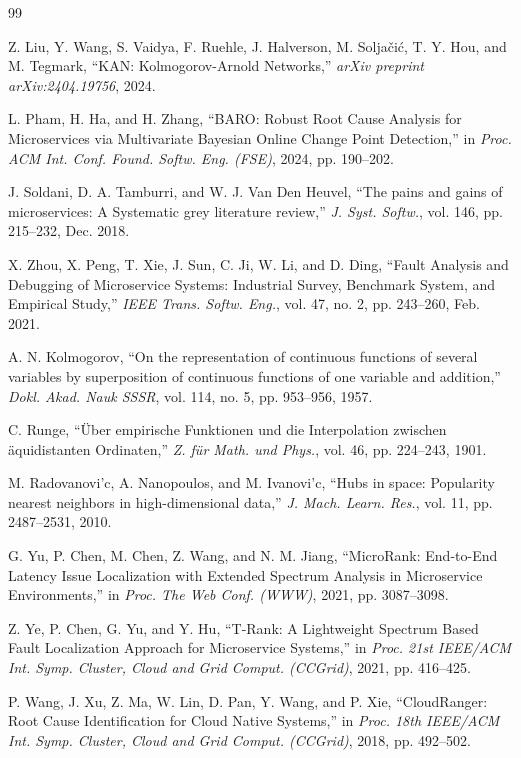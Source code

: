 \documentclass[conference]{IEEEtran}
\begin{document}
\begin{thebibliography}{99}
\small

Z. Liu, Y. Wang, S. Vaidya, F. Ruehle, J. Halverson, M. Soljačić, T. Y. Hou, and M. Tegmark,
``KAN: Kolmogorov-Arnold Networks,''
\textit{arXiv preprint arXiv:2404.19756}, 2024.

L. Pham, H. Ha, and H. Zhang,
``BARO: Robust Root Cause Analysis for Microservices via Multivariate Bayesian Online Change Point Detection,''
in \textit{Proc. ACM Int. Conf. Found. Softw. Eng. (FSE)}, 2024, pp. 190--202.

J. Soldani, D. A. Tamburri, and W. J. Van Den Heuvel,
``The pains and gains of microservices: A Systematic grey literature review,''
\textit{J. Syst. Softw.}, vol. 146, pp. 215--232, Dec. 2018.

X. Zhou, X. Peng, T. Xie, J. Sun, C. Ji, W. Li, and D. Ding,
``Fault Analysis and Debugging of Microservice Systems: Industrial Survey, Benchmark System, and Empirical Study,''
\textit{IEEE Trans. Softw. Eng.}, vol. 47, no. 2, pp. 243--260, Feb. 2021.

A. N. Kolmogorov,
``On the representation of continuous functions of several variables by superposition of continuous functions of one variable and addition,''
\textit{Dokl. Akad. Nauk SSSR}, vol. 114, no. 5, pp. 953--956, 1957.

C. Runge,
``{\"U}ber empirische Funktionen und die Interpolation zwischen {\"a}quidistanten Ordinaten,''
\textit{Z. f{\"u}r Math. und Phys.}, vol. 46, pp. 224--243, 1901.

M. Radovanovi{'c}, A. Nanopoulos, and M. Ivanovi{'c},
``Hubs in space: Popularity nearest neighbors in high-dimensional data,''
\textit{J. Mach. Learn. Res.}, vol. 11, pp. 2487--2531, 2010.

G. Yu, P. Chen, M. Chen, Z. Wang, and N. M. Jiang,
``MicroRank: End-to-End Latency Issue Localization with Extended Spectrum Analysis in Microservice Environments,''
in \textit{Proc. The Web Conf. (WWW)}, 2021, pp. 3087--3098.

Z. Ye, P. Chen, G. Yu, and Y. Hu,
``T-Rank: A Lightweight Spectrum Based Fault Localization Approach for Microservice Systems,''
in \textit{Proc. 21st IEEE/ACM Int. Symp. Cluster, Cloud and Grid Comput. (CCGrid)}, 2021, pp. 416--425.

P. Wang, J. Xu, Z. Ma, W. Lin, D. Pan, Y. Wang, and P. Xie,
``CloudRanger: Root Cause Identification for Cloud Native Systems,''
in \textit{Proc. 18th IEEE/ACM Int. Symp. Cluster, Cloud and Grid Comput. (CCGrid)}, 2018, pp. 492--502.


\end{thebibliography}
\end{document}
